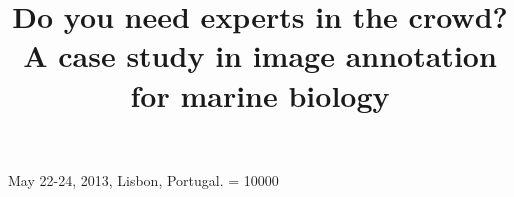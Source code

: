 \documentclass{sig-alternate}
\begin{document}
 {May 22-24, 2013, Lisbon, Portugal.} 
\widowpenalty = 10000


\title{Do you need experts in the crowd? A case study in image annotation for marine biology}

\newif\ifanon
\ifx\anonymous\undefined
  \anonfalse
\else
  \anontrue
\fi

\ifanon
\author{}
\else
\author{
\alignauthor Jiyin He\\
\alignauthor Jacco van Ossenbruggen\\
\alignauthor Arjen P. de Vries\\
\and
   \email{\{j.he, jacco.van.ossenbruggen, arjen.de.vries\}@cwi.nl}
\and   
   \affaddr{Centrum Wiskunde en Informatica, Science Park 123}\\
   \affaddr{1098XG, Amsterdam, the Netherlands}\\
}
\fi


\maketitle
\end{document}
